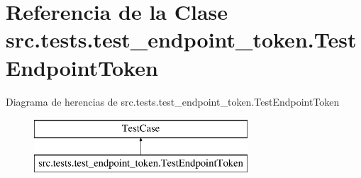 \hypertarget{classsrc_1_1tests_1_1test__endpoint__token_1_1_test_endpoint_token}{\section{Referencia de la Clase src.\-tests.\-test\-\_\-endpoint\-\_\-token.\-Test\-Endpoint\-Token}
\label{classsrc_1_1tests_1_1test__endpoint__token_1_1_test_endpoint_token}
}
Diagrama de herencias de src.\-tests.\-test\-\_\-endpoint\-\_\-token.\-Test\-Endpoint\-Token\begin{figure}[H]
\begin{center}
\leavevmode
\includegraphics[height=2.000000cm]{classsrc_1_1tests_1_1test__endpoint__token_1_1_test_endpoint_token}
\end{center}
\end{figure}
